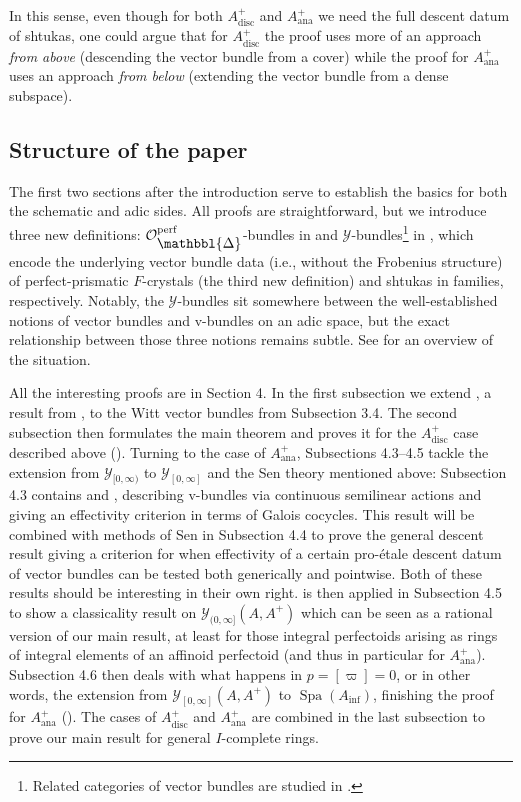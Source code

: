 \documentclass[10pt,twoside]{article}
\numberwithin{equation}{section}
\theoremstyle{plain}
\theoremstyle{definition}
\DeclareMathOperator{\Spa}{Spa}
\DeclareMathOperator{\ana}{ana}
\DeclareMathOperator{\disc}{disc}
\newcommand{\MCO}{\mathcal{O}}
\newcommand{\MCY}{\mathcal{Y}}
\DeclareMathOperator{\perf}{perf}
\newcommand{\Prism}{{\mathlarger{\mathbbl{\Delta}}}}
\DeclareMathOperator{\Inf}{inf}
\newcommand{\Ainf}{A_{\Inf}}
\newcommand{\Ycc}{\MCY_{[0,\infty]}}
\newcommand{\Yco}{\MCY_{[0,\infty)}}
\newcommand{\Yoc}{\MCY_{(0,\infty]}}
\begin{document}
In this sense, even though for both \(A^+_{\disc}\) and \(A^+_{\ana}\) we need the full descent datum of shtukas, one could argue that for \(A^+_{\disc}\) the proof uses more of an approach \emph{from above} (descending the vector bundle from a cover) while the proof for \(A^+_{\ana}\) uses an approach \emph{from below} (extending the vector bundle from a dense subspace).

\subsection*{Structure of the paper}

The first two sections after the introduction serve to establish the basics for both the schematic and adic sides. All proofs are straightforward, but we introduce three new definitions: \(\MCO_{\Prism}^{\perf}\)-bundles in  and \(\MCY\)-bundles\footnote{Related categories of vector bundles are studied in \cite[Section 3]{GI23}.} in , which encode the underlying vector bundle data (i.e., without the Frobenius structure) of perfect-prismatic \(F\)-crystals (the third new definition) and shtukas in families, respectively. Notably, the \(\MCY\)-bundles sit somewhere between the well-established notions of vector bundles and v-bundles on an adic space, but the exact relationship between those three notions remains subtle. See  for an overview of the situation.\par
All the interesting proofs are in Section 4. In the first subsection we extend , a result from \cite{Kim}, to the Witt vector bundles from Subsection 3.4. The second subsection then formulates the main theorem and proves it for the \(A^+_{\disc}\) case described above (). Turning to the case of \(A^+_{\ana}\), Subsections 4.3--4.5 tackle the extension from \(\Yco\) to \(\Ycc\) and the Sen theory mentioned above: Subsection 4.3 contains  and , describing v-bundles via continuous semilinear actions and giving an effectivity criterion in terms of Galois cocycles. This result will be combined with methods of Sen in Subsection 4.4 to prove the general descent result  giving a criterion for when effectivity of a certain pro-étale descent datum of vector bundles can be tested both generically and pointwise. Both of these results should be interesting in their own right.  is then applied in Subsection 4.5 to show a classicality result on \(\Yoc(A,A^+)\) which can be seen as a rational version of our main result, at least for those integral perfectoids arising as rings of integral elements of an affinoid perfectoid (and thus in particular for \(A^+_{\ana}\)). Subsection 4.6 then deals with what happens in \(p=[\varpi]=0\), or in other words, the extension from \(\Ycc(A,A^+)\) to \(\Spa(\Ainf)\), finishing the proof for \(A^+_{\ana}\) (). The cases of \(A^+_{\disc}\) and \(A^+_{\ana}\) are combined in the last subsection to prove our main result  for general \(I\)-complete rings.\par
\end{document}
